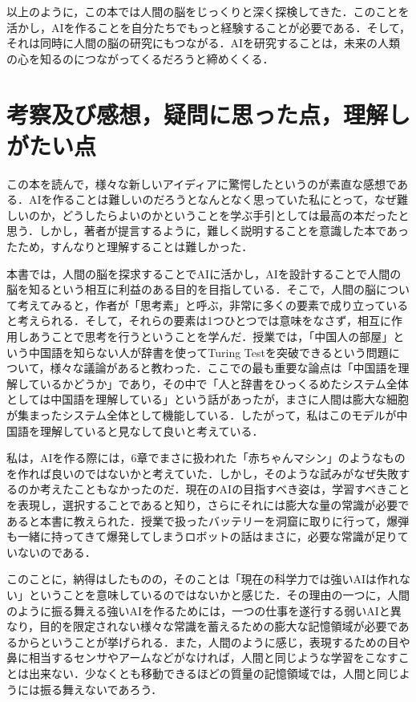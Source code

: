 \documentclass{jarticle}
\begin{document}
以上のように，この本では人間の脳をじっくりと深く探検してきた．このことを活かし，AIを作ることを自分たちでもっと経験することが必要である．そして，それは同時に人間の脳の研究にもつながる．AIを研究することは，未来の人類の心を知るのにつながってくるだろうと締めくくる．





\section{考察及び感想，疑問に思った点，理解しがたい点}
この本を読んで，様々な新しいアイディアに驚愕したというのが素直な感想である．AIを作ることは難しいのだろうとなんとなく思っていた私にとって，なぜ難しいのか，どうしたらよいのかということを学ぶ手引としては最高の本だったと思う．しかし，著者が提言するように，難しく説明することを意識した本であったため，すんなりと理解することは難しかった．

本書では，人間の脳を探求することでAIに活かし，AIを設計することで人間の脳を知るという相互に利益のある目的を目指している．そこで，人間の脳について考えてみると，作者が「思考素」と呼ぶ，非常に多くの要素で成り立っていると考えられる．そして，それらの要素は1つひとつでは意味をなさず，相互に作用しあうことで思考を行うということを学んだ．授業では，「中国人の部屋」という中国語を知らない人が辞書を使ってTuring Testを突破できるという問題について，様々な議論があると教わった．ここでの最も重要な論点は「中国語を理解しているかどうか」であり，その中で「人と辞書をひっくるめたシステム全体としては中国語を理解している」という話があったが，まさに人間は膨大な細胞が集まったシステム全体として機能している．したがって，私はこのモデルが中国語を理解していると見なして良いと考えている．

私は，AIを作る際には，6章でまさに扱われた「赤ちゃんマシン」のようなものを作れば良いのではないかと考えていた．しかし，そのような試みがなぜ失敗するのか考えたこともなかったのだ．現在のAIの目指すべき姿は，学習すべきことを表現し，選択することであると知り，さらにそれには膨大な量の常識が必要であると本書に教えられた．授業で扱ったバッテリーを洞窟に取りに行って，爆弾も一緒に持ってきて爆発してしまうロボットの話はまさに，必要な常識が足りていないのである．

このことに，納得はしたものの，そのことは「現在の科学力では強いAIは作れない」ということを意味しているのではないかと感じた．その理由の一つに，人間のように振る舞える強いAIを作るためには，一つの仕事を遂行する弱いAIと異なり，目的を限定されない様々な常識を蓄えるための膨大な記憶領域が必要であるからということが挙げられる．また，人間のように感じ，表現するための目や鼻に相当するセンサやアームなどがなければ，人間と同じような学習をこなすことは出来ない．少なくとも移動できるほどの質量の記憶領域では，人間と同じようには振る舞えないであろう．
\end{document}
